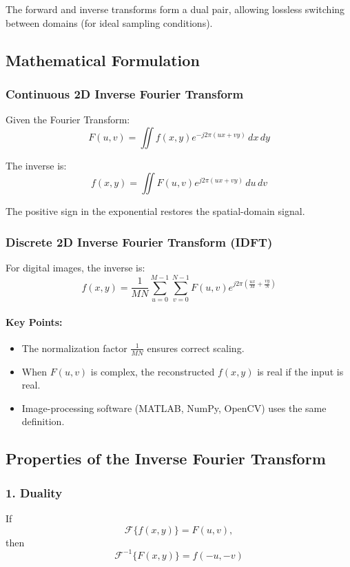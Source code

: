 \documentclass{AnantDocumentation}
\begin{document}
The forward and inverse transforms form a dual pair, allowing lossless switching between domains (for ideal sampling conditions).

\subsection{Mathematical Formulation}

\subsubsection{Continuous 2D Inverse Fourier Transform}

Given the Fourier Transform:
\[
F(u,v) = \iint f(x,y)e^{-j2\pi(ux+vy)} \, dx\,dy
\]

The inverse is:
\[
f(x,y) = \iint F(u,v)e^{j2\pi(ux+vy)} \, du\,dv
\]

The positive sign in the exponential restores the spatial-domain signal.

\subsubsection{Discrete 2D Inverse Fourier Transform (IDFT)}

For digital images, the inverse is:
\begin{equation}
f(x,y) = \frac{1}{MN}
\sum_{u=0}^{M-1} \sum_{v=0}^{N-1}
F(u,v)e^{j2\pi \left( \frac{ux}{M} + \frac{vy}{N} \right)}
\end{equation}

\paragraph{Key Points:}
\begin{itemize}
\item The normalization factor $\frac{1}{MN}$ ensures correct scaling.
\item When $F(u,v)$ is complex, the reconstructed $f(x,y)$ is real if the input is real.
\item Image-processing software (MATLAB, NumPy, OpenCV) uses the same definition.
\end{itemize}

\subsection{Properties of the Inverse Fourier Transform}

\subsubsection{1. Duality}
If
\[
\mathcal{F}\{f(x,y)\} = F(u,v),
\]
then
\[
\mathcal{F}^{-1}\{F(x,y)\} = f(-u,-v)
\]
\end{document}
